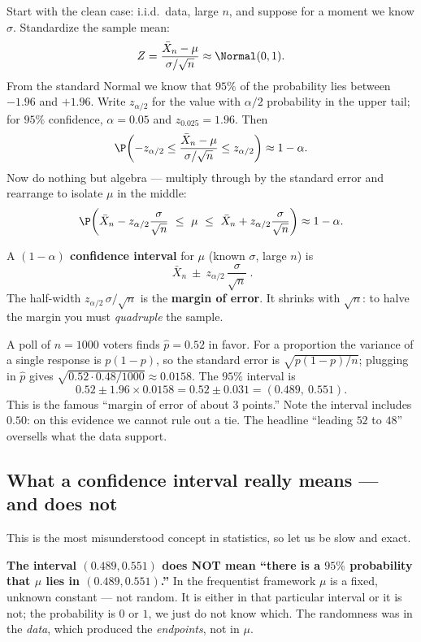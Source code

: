 Start with the clean case: i.i.d.\ data, large $n$, and suppose for a moment we know
$\sigma$. Standardize the sample mean:
\[
  Z = \frac{\bar X_n - \mu}{\sigma/\sqrt n} \approx \Normal(0,1).
\]
From the standard Normal we know that $95\%$ of the probability lies between $-1.96$ and
$+1.96$. Write $z_{\alpha/2}$ for the value with $\alpha/2$ probability in the upper
tail; for $95\%$ confidence, $\alpha = 0.05$ and $z_{0.025} = 1.96$. Then
\[
  \P\!\left(-z_{\alpha/2} \le \frac{\bar X_n - \mu}{\sigma/\sqrt n} \le z_{\alpha/2}\right)
  \approx 1-\alpha .
\]
Now do nothing but algebra --- multiply through by the standard error and rearrange to
isolate $\mu$ in the middle:
\[
  \P\!\left(\bar X_n - z_{\alpha/2}\frac{\sigma}{\sqrt n}
  \ \le\ \mu\ \le\
  \bar X_n + z_{\alpha/2}\frac{\sigma}{\sqrt n}\right) \approx 1-\alpha .
\]

\begin{formalbox}
A \textbf{$(1-\alpha)$ confidence interval} for $\mu$ (known $\sigma$, large $n$) is
\[
  \boxed{\ \bar X_n \ \pm\ z_{\alpha/2}\,\frac{\sigma}{\sqrt n}\ } .
\]
The half-width $z_{\alpha/2}\,\sigma/\sqrt n$ is the \textbf{margin of error}. It shrinks
with $\sqrt n$: to halve the margin you must \emph{quadruple} the sample.
\end{formalbox}

\begin{example}
\label{ch32:ex-poll}
A poll of $n=1000$ voters finds $\hat p = 0.52$ in favor. For a proportion the variance
of a single response is $p(1-p)$, so the standard error is $\sqrt{p(1-p)/n}$; plugging
in $\hat p$ gives $\sqrt{0.52\cdot 0.48/1000}\approx 0.0158$. The $95\%$ interval is
\[
  0.52 \pm 1.96 \times 0.0158 = 0.52 \pm 0.031 = (0.489,\ 0.551).
\]
This is the famous ``margin of error of about $3$ points.'' Note the interval includes
$0.50$: on this evidence we cannot rule out a tie. The headline ``leading $52$ to $48$''
oversells what the data support.
\end{example}

\subsection{What a confidence interval really means --- and does not}

This is the most misunderstood concept in statistics, so let us be slow and exact.

\begin{trapbox}
\textbf{The interval $(0.489, 0.551)$ does NOT mean ``there is a $95\%$ probability that
$\mu$ lies in $(0.489, 0.551)$.''} In the frequentist framework $\mu$ is a fixed,
unknown constant --- not random. It is either in that particular interval or it is not;
the probability is $0$ or $1$, we just do not know which. The randomness was in the
\emph{data}, which produced the \emph{endpoints}, not in $\mu$.
\end{trapbox}

